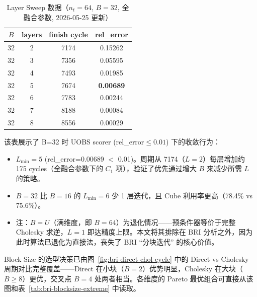     \begin{table}[H]
        \centering
        \caption{Layer Sweep 数据（$n_{t}=64$, $B=32$, 全融合参数, 2026-05-25
        更新）}
        \begin{tabular}{c c c c}
            \toprule $B$ & layers & finish cycle & rel\_error       \\
            \midrule 32  & 2      & 7174         & 0.15262          \\
            32           & 3      & 7356         & 0.05595          \\
            32           & 4      & 7493         & 0.01985          \\
            32           & 5      & 7674         & \textbf{0.00689} \\
            32           & 6      & 7783         & 0.00244          \\
            32           & 7      & 8188         & 0.00084          \\
            32           & 8      & 8556         & 0.00029          \\
            \bottomrule
        \end{tabular}
    \end{table}

    该表展示了 B=32 时 UOBS scorer (rel\_error$\leq0.01$) 下的收敛行为：
    \begin{itemize}
        \item $L_{\min}=5$ (rel\_error=0.00689 $<$ 0.01)。周期从 7174（$L=2$）每层增加约
            175 cycles（全融合参数下的 $C_{1}$ 项），验证了优先通过增大 $B$
            来减少所需 $L$ 的策略。

        \item $B=32$ 比 $B=16$ 的 $L_{\min}=6$ 少 1 层迭代，且 Cube 利用率更高（78.4\%
            vs 75.6\%）。

        \item 注：$B=U$（满维度，即 $B=64$）为退化情况——预条件器等价于完整
            Cholesky 求逆，$L=1$ 即达精度上限。本文将其排除在 BRI 分析之外，因为此时算法已退化为直接法，丧失了
            BRI ``分块迭代'' 的核心价值。
    \end{itemize}

    Block Size 的选型决策已由图~\ref{fig:bri-direct-chol-cycle} 中的 Direct vs
    Cholesky 周期对比完整覆盖——Direct 在小块（$B=2$）优势明显，Cholesky 在大块（$B
    \ge8$）更优，交叉点 $B=4$ 处两者相当。各维度的 Pareto
    最优组合可直接从该图和表~\ref{tab:bri-blocksize-extreme} 中读取。

